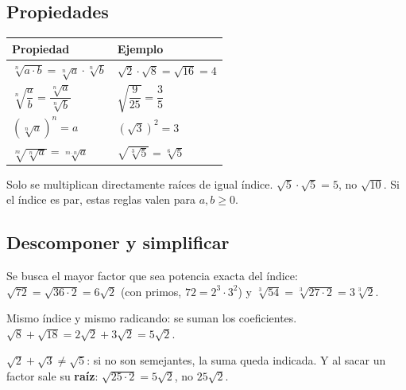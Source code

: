 \subsection{Propiedades}
\begin{center}
\renewcommand{\arraystretch}{1.5}
\begin{tabular}{ll}
\toprule Propiedad & Ejemplo\\ \midrule
$\sqrt[n]{a\cdot b} = \sqrt[n]{a}\cdot\sqrt[n]{b}$ & $\sqrt{2}\cdot\sqrt{8} = \sqrt{16} = 4$\\
$\sqrt[n]{\dfrac{a}{b}} = \dfrac{\sqrt[n]{a}}{\sqrt[n]{b}}$ & $\sqrt{\dfrac{9}{25}} = \dfrac{3}{5}$\\
$\left(\sqrt[n]{a}\right)^n = a$ & $\left(\sqrt{3}\right)^2 = 3$\\
$\sqrt[m]{\sqrt[n]{a}} = \sqrt[m\cdot n]{a}$ & $\sqrt{\sqrt[3]{5}} = \sqrt[6]{5}$\\ \bottomrule
\end{tabular}
\end{center}
\begin{ojo} Solo se multiplican directamente raíces de igual índice. $\sqrt{5}\cdot\sqrt{5} = 5$, no $\sqrt{10}$. Si el índice es par, estas reglas valen para $a, b \geq 0$.\end{ojo}

\subsection{Descomponer y simplificar}
Se busca el mayor factor que sea potencia exacta del índice: $\sqrt{72} = \sqrt{36\cdot 2} = 6\sqrt{2}$ (con primos, $72 = 2^3\cdot 3^2$) y $\sqrt[3]{54} = \sqrt[3]{27\cdot 2} = 3\sqrt[3]{2}$.
\begin{clave} Mismo índice y mismo radicando: se suman los coeficientes. $\sqrt{8} + \sqrt{18} = 2\sqrt{2} + 3\sqrt{2} = 5\sqrt{2}$.\end{clave}
\begin{ojo} $\sqrt{2} + \sqrt{3} \neq \sqrt{5}$: si no son semejantes, la suma queda indicada. Y al sacar un factor sale su \textbf{raíz}: $\sqrt{25\cdot 2} = 5\sqrt{2}$, no $25\sqrt{2}$.\end{ojo}

